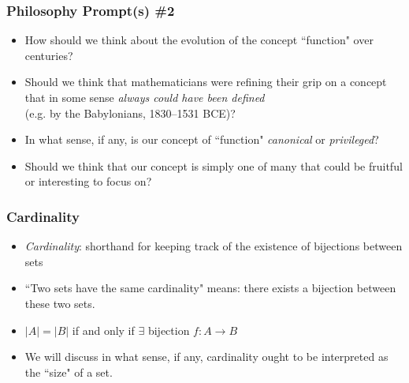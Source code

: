 \begin{frame}
\frametitle{Philosophy Prompt(s) \#2}

\begin{itemize}[<+->]

\item How should we think about the evolution of the concept ``function" over centuries?

\item Should we think that mathematicians were refining their grip on a concept that in some sense \textit{always could have been defined} \\ (e.g. by the Babylonians, 1830–1531 BCE)?

\item In what sense, if any, is our concept of ``function" \textit{canonical} or \textit{privileged}?

\item Should we think that our concept is simply one of many that could be fruitful or interesting to focus on?



\end{itemize}
\end{frame}

\begin{frame}
\frametitle{Cardinality}

\begin{itemize}[<+->]

\item \emph{Cardinality}: shorthand for keeping track of the existence of bijections between sets

\item ``Two sets have the same cardinality" means: there exists a bijection between these two sets. 

\item $|A| = |B|$ if and only if $\exists$ bijection $f: A \rightarrow B$

\item We will discuss in what sense, if any, cardinality ought to be interpreted as the ``size" of a set. 

\end{itemize}
\end{frame}

